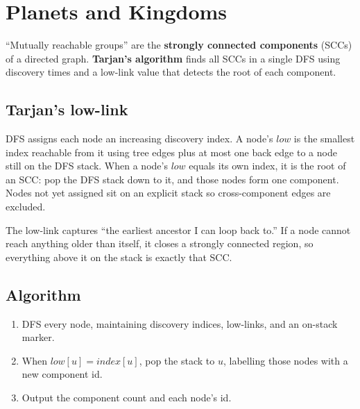 \section{Planets and Kingdoms}
\label{sec:cses-planets-kingdoms}


\begin{patternbox}
``Mutually reachable groups'' are the \textbf{strongly connected components}
(SCCs) of a directed graph. \textbf{Tarjan's algorithm} finds all SCCs in a
single DFS using discovery times and a low-link value that detects the root
of each component.
\end{patternbox}

\subsection*{Tarjan's low-link}

DFS assigns each node an increasing discovery index. A node's
$\textit{low}$ is the smallest index reachable from it using tree edges
plus at most one back edge to a node still on the DFS stack. When a node's
$\textit{low}$ equals its own index, it is the root of an SCC: pop the DFS
stack down to it, and those nodes form one component. Nodes not yet assigned
sit on an explicit stack so cross-component edges are excluded.

\begin{ideabox}[low == index Marks a Component Root]
The low-link captures ``the earliest ancestor I can loop back to.'' If a
node cannot reach anything older than itself, it closes a strongly connected
region, so everything above it on the stack is exactly that SCC.
\end{ideabox}

\subsection*{Algorithm}

\begin{enumerate}
  \item DFS every node, maintaining discovery indices, low-links, and an
        on-stack marker.
  \item When $\textit{low}[u]=\textit{index}[u]$, pop the stack to $u$,
        labelling those nodes with a new component id.
  \item Output the component count and each node's id.
\end{enumerate}

